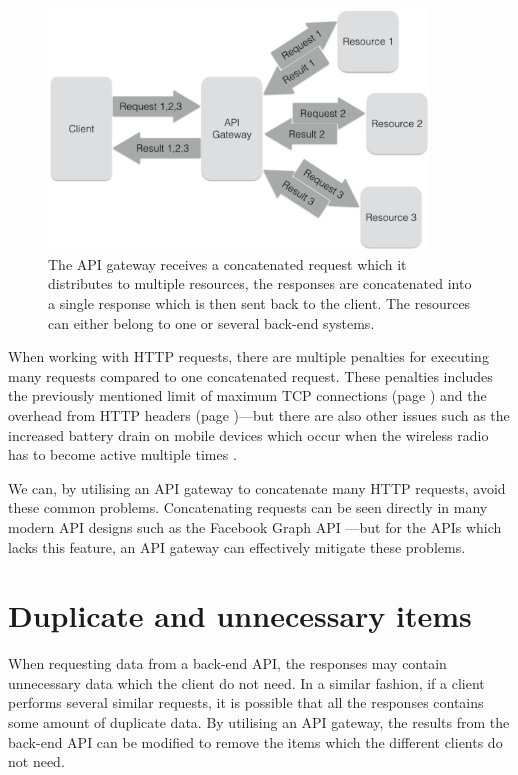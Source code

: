 \documentclass{cslthse-msc}
\begin{document}
\begin{figure}[H]
  \centering
    \begin{center}
      \includegraphics[width=0.9\textwidth]{images/api_gateway_concatenation.png}
    \end{center}
  \caption{The API gateway receives a concatenated request which it distributes to multiple resources, the responses are concatenated into a single response which is then sent back to the client. The resources can either belong to one or several back-end systems.}
\end{figure}

When working with HTTP requests, there are multiple penalties for executing many requests compared to one concatenated request. These penalties includes the previously mentioned limit of maximum TCP connections (page \pageref{max_tcp}) and the overhead from HTTP headers (page \pageref{headers})---but there are also other issues such as the increased battery drain on mobile devices which occur when the wireless radio has to become active multiple times \cite{battery}.

We can, by utilising an API gateway to concatenate many HTTP requests, avoid these common problems. Concatenating requests can be seen directly in many modern API designs such as the Facebook Graph API \cite{facebook_batch_requests}---but for the APIs which lacks this feature, an API gateway can effectively mitigate these problems.

\section{Duplicate and unnecessary items}
When requesting data from a back-end API, the responses may contain unnecessary data which the client do not need. In a similar fashion, if a client performs several similar requests, it is possible that all the responses contains some amount of duplicate data. By utilising an API gateway, the results from the back-end API can be modified to remove the items which the different clients do not need.
\end{document}
